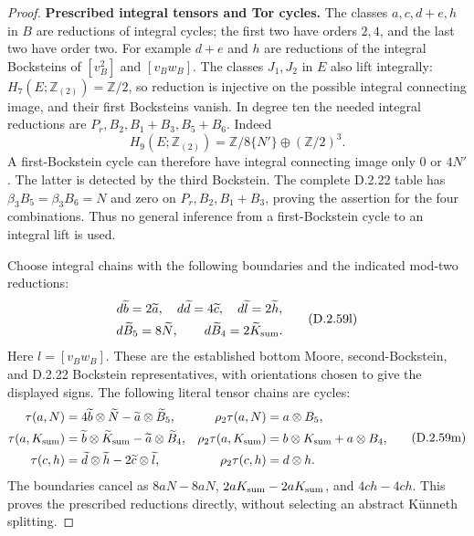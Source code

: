 \begin{proof}
\textbf{Prescribed integral tensors and Tor cycles.}
The classes $a,c,d+e,h$ in $B$ are reductions of integral cycles;
the first two have orders $2,4$, and the last two have order two.
For example $d+e$ and $h$ are reductions of the integral
Bocksteins of $[v_B^2]$ and $[v_Bw_B]$.
The classes $J_1,J_2$ in $E$ also lift integrally:
$H_7(E;\mathbb Z_{(2)})=\mathbb Z/2$, so reduction is injective
on the possible integral connecting image, and their first
Bocksteins vanish.  In degree ten the needed integral reductions
are $P_r,B_2,B_1+B_3,B_5+B_6$.  Indeed
\[
 H_9(E;\mathbb Z_{(2)})=
       \mathbb Z/8\{N'\}\oplus(\mathbb Z/2)^3.
 \tag{D.2.59k}
\]
A first-Bockstein cycle can therefore have integral connecting
image only $0$ or $4N'$.  The latter is detected by the third
Bockstein.  The complete D.2.22 table has
$\beta_3B_5=\beta_3B_6=N$ and zero on
$P_r,B_2,B_1+B_3$, proving the assertion for the four combinations.
Thus no general inference from a first-Bockstein cycle to an
integral lift is used.

Choose integral chains with the following boundaries and the
indicated mod-two reductions:
\[
 \begin{gathered}
 d\widetilde b=2\widetilde a,
 \quad d\widetilde d=4\widetilde c,
 \quad d\widetilde l=2\widetilde h,\\
 d\widetilde B_5=8\widetilde N,
 \qquad d\widetilde B_4=2\widetilde K_{\rm sum}.
 \end{gathered}
 \tag{D.2.59l}
\]
Here $l=[v_Bw_B]$.  These are the established bottom Moore,
second-Bockstein, and D.2.22 Bockstein representatives, with
orientations chosen to give the displayed signs.  The following
literal tensor chains are cycles:
\[
 \begin{aligned}
 \tau(a,N)&=4\widetilde b\otimes\widetilde N
                 -\widetilde a\otimes\widetilde B_5,
       &\rho_2\tau(a,N)&=a\otimes B_5,\\
 \tau(a,K_{\rm sum})&=\widetilde b\otimes\widetilde K_{\rm sum}
                 -\widetilde a\otimes\widetilde B_4,
       &\rho_2\tau(a,K_{\rm sum})&=b\otimes K_{\rm sum}+a\otimes B_4,\\
 \tau(c,h)&=\widetilde d\otimes\widetilde h
                 -2\widetilde c\otimes\widetilde l,
       &\rho_2\tau(c,h)&=d\otimes h.
 \end{aligned}
 \tag{D.2.59m}
\]
The boundaries cancel as $8aN-8aN$, $2aK_{\rm sum}-2aK_{\rm sum}$,
and $4ch-4ch$.  This proves the prescribed reductions directly,
without selecting an abstract K\"unneth splitting.


\end{proof}
